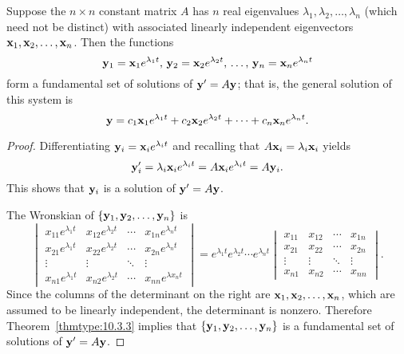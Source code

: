 \documentclass{ximera}
\begin{document}
\begin{theorem}\label{thmtype:10.4.1}
 Suppose the $n\times n$
constant matrix $A$ has $n$ real eigenvalues
$\lambda_1,\lambda_2,\ldots,\lambda_n$
(which need not be distinct) with associated
linearly independent eigenvectors ${\bf x}_1,{\bf x}_2,\ldots,{\bf x}_n$.
Then the functions
$$
{\bf y}_1={\bf x}_1e^{\lambda_1 t},\,
 {\bf y}_2={\bf x}_2e^{\lambda_2 t},\,
\dots,\,
{\bf y}_n={\bf x}_ne^{\lambda_n t}
$$
 form a fundamental set of solutions of  ${\bf y}'=A{\bf y}$;
that is, the general solution of this system is
$$
{\bf y}=c_1{\bf x}_1e^{\lambda_1 t}+c_2{\bf x}_2e^{\lambda_2 t}
+\cdots+c_n{\bf x}_ne^{\lambda_n t}.
$$
\end{theorem}

\begin{proof}
Differentiating ${\bf y}_i={\bf x}_ie^{\lambda_it}$ and recalling
that $A{\bf x}_i=\lambda_i{\bf x}_i$ yields
$$
{\bf y}_i'=\lambda_i{\bf x}_ie^{\lambda_it}=A{\bf x}_ie^{\lambda_it}
=A{\bf y}_i.
$$
This shows that ${\bf y}_i$ is a solution of ${\bf y}'=A{\bf y}$.

The Wronskian of
 $\{{\bf y}_1,{\bf y}_2,\ldots,{\bf y}_n\}$ is
$$
\begin{vmatrix}  x_{11}e^{\lambda_1 t}& x_{12}e^{\lambda_2
t}&\cdots& x_{1n}e^{\lambda_n t}\\
 x_{21}e^{\lambda_1 t}& x_{22}e^{\lambda_2
t}&\cdots& x_{2n}e^{\lambda_n t}\\\vdots&\vdots&\ddots&\vdots\\
  x_{n1}e^{\lambda_1 t}& x_{n2}e^{\lambda_2
t}&\cdots& x_{nn}e^{\lambda x_n t}\end{vmatrix}
=e^{\lambda_1 t}e^{\lambda_2 t}\cdots e^{\lambda_n t}
\begin{vmatrix}
x_{11}&x_{12}&\cdots&x_{1n}\\
x_{21}&x_{22}&\cdots&x_{2n}\\
\vdots&\vdots&\ddots&\vdots\\
x_{n1}&x_{n2}&\cdots&x_{nn}
\end{vmatrix}.
$$
Since the columns of the determinant on the right are ${\bf x}_1, {\bf
x}_2, \dots, {\bf x}_n$, which are assumed to be linearly independent,
the determinant is nonzero. Therefore
Theorem~\ref{thmtype:10.3.3} implies that
$\{{\bf y}_1,{\bf y}_2,\ldots,{\bf y}_n\}$ is a fundamental set of
solutions of ${\bf y}'=A{\bf y}$.
\end{proof}
\end{document}
